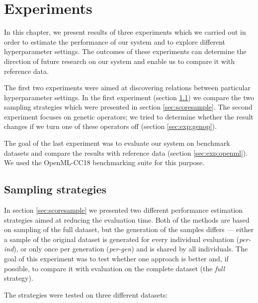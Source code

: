 \chapter{Experiments} \label{experiments}
In this chapter, we present results of three experiments which we carried out
in order to estimate the performance of our system and to explore different
hyperparameter settings. The outcomes of these experiments can determine the
direction of future research on our system and enable us to compare
it with reference data.

The first two experiments were aimed at discovering relations between
particular hyperparameter settings. In the first experiment
(section \ref{sec:exp:sample}) we compare the two
sampling strategies which were presented in section \ref{sec:scoresample}.
The second experiment focuses on genetic operators; we tried to determine
whether the result changes if we turn one of these operators off
(section \ref{sec:exp:genop}). 

The goal of the last experiment was to evaluate our system on benchmark
datasets and compare the results with reference data
(section \ref{sec:exp:openml}). We used the OpenML-CC18 benchmarking suite for
this purpose. \citep{openmlcc18}

\section{Sampling strategies} \label{sec:exp:sample}
In section \ref{sec:scoresample} we presented two different performance
estimation strategies aimed at reducing the evaluation time. Both of the methods
are based on sampling of the full dataset, but the generation of the samples
differs --- either a sample of the original dataset is generated for every
individual evaluation (\emph{per-ind}), or only once per generation
(\emph{per-gen}) and is shared by all individuals. The goal of this experiment
was to test whether one approach is better and, if possible, to compare it with
evaluation on the complete dataset (the \emph{full} strategy).

The strategies were tested on three different datasets:

